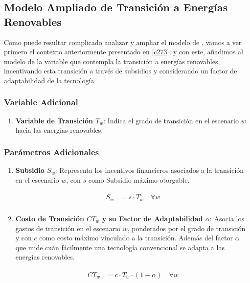 \vspace{2.5mm}
\subsection{Modelo Ampliado de Transición a Energías Renovables\label{c38}}

Como puede resultar complicado analizar y ampliar el modelo de , vamos a ver primero el contexto anteriormente presentado en \ref{c273}, y con este, añadimos al modelo de  la variable que contempla la transición a energías renovables, incentivando esta transición a través de subsidios y considerando un factor de adaptabilidad de la tecnología.

\vspace{2.5mm}
\subsubsection{Variable Adicional}

\begin{enumerate}
    \item \textbf{Variable de Transición \( T_w \)}: Indica el grado de transición en el escenario \( w \) hacia las energías renovables.
\end{enumerate}

\vspace{2.5mm}
\subsubsection{Parámetros Adicionales}

\begin{enumerate}
    \item \textbf{Subsidio \( S_w \)}: Representa los incentivos financieros asociados a la transición en el escenario \( w \), con \( s \) como Subsidio máximo otorgable.
    
    \begin{align}
    \begin{array}{rrclcl}
        S_w &= s \cdot T_w \quad \forall w \label{c334}\\
    \end{array}
    \end{align}

    \item \textbf{Costo de Transición \( CT_w \) y su  Factor de Adaptabilidad \( \alpha \)}: Asocia los gastos de transición en el escenario \( w \), ponderados por el grado de transición y con \( c \) como costo máximo vinculado a la transición. Además del factor \( \alpha \) que mide cuán fácilmente una tecnología convencional se adapta a las energías renovables.

    \begin{align}
    \begin{array}{rrclcl}
      CT_w &= c \cdot T_w \cdot (1 - \alpha) \quad \forall w \label{c335}\\
    \end{array}
    \end{align}
    
\end{enumerate}

